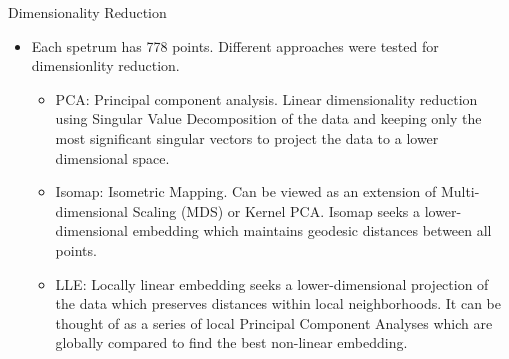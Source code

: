 \documentclass[final,hyperref={pdfpagelabels=false}]{beamer}
\begin{document}
\begin{frame}[t]
\begin{columns}[t]
\begin{column}{.465\textwidth}
\begin{block}{Dimensionality Reduction}
\begin{itemize}
\item Each spetrum has 778 points. Different approaches were tested for dimensionlity reduction.
\begin{itemize}
\item PCA: Principal component analysis. Linear dimensionality reduction using Singular Value Decomposition of the data and keeping only the most significant singular vectors to project the data to a lower dimensional space.
\item Isomap: Isometric Mapping. Can be viewed as an extension of Multi-dimensional Scaling (MDS) or Kernel PCA. Isomap seeks a lower-dimensional embedding which maintains geodesic distances between all points.
\item LLE: Locally linear embedding seeks a lower-dimensional projection of the data which preserves distances within local neighborhoods. It can be thought of as a series of local Principal Component Analyses which are globally compared to find the best non-linear embedding.
\end{itemize}
\end{itemize}




\end{block}
\end{column}
\end{columns}
\end{frame}
\end{document}
